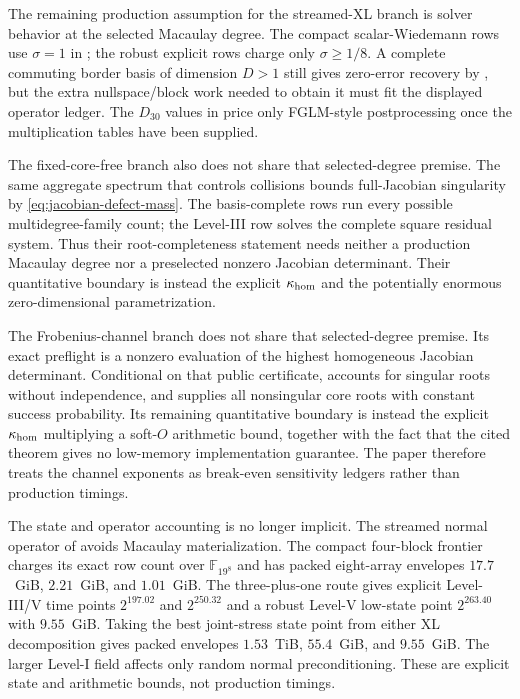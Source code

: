 \documentclass[11pt]{article}
\newcommand{\F}{\mathbb F}
\begin{document}
The remaining production assumption for the streamed-XL branch is solver
behavior at the selected Macaulay degree.  The compact scalar-Wiedemann rows use $\sigma=1$ in
; the robust explicit rows charge only
$\sigma\ge1/8$.  A complete commuting border basis of dimension $D>1$ still
gives zero-error recovery by , but the extra
nullspace/block work needed to obtain it must fit the displayed operator
ledger.  The $D_{30}$ values in  price only
FGLM-style postprocessing once the multiplication tables have been supplied.

The fixed-core-free branch also does not share that selected-degree premise.
The same aggregate spectrum that controls collisions bounds full-Jacobian
singularity by \eqref{eq:jacobian-defect-mass}.  The basis-complete rows run
every possible multidegree-family count; the Level-III row solves the complete
square residual system.  Thus their root-completeness statement needs neither
a production Macaulay degree nor a preselected nonzero Jacobian determinant.
Their quantitative boundary is instead the explicit $\kappa_{\rm hom}$ and
the potentially enormous zero-dimensional parametrization.

The Frobenius-channel branch does not share that selected-degree premise.  Its
exact preflight is a nonzero evaluation of the highest homogeneous Jacobian
determinant.  Conditional on that public certificate, 
accounts for singular roots without independence, and
 supplies all nonsingular core roots with
constant success probability.  Its remaining quantitative boundary is
instead the explicit $\kappa_{\rm hom}$ multiplying a soft-$O$ arithmetic
bound, together with the fact that the cited theorem gives no low-memory
implementation guarantee.  The paper therefore treats the channel exponents
as break-even sensitivity ledgers rather than production timings.

The state and operator accounting is no longer implicit.  The streamed normal
operator of  avoids Macaulay materialization.
The compact four-block frontier charges its exact row count over
$\F_{19^8}$ and has packed eight-array envelopes $17.7$~GiB,
$2.21$~GiB, and $1.01$~GiB.  The three-plus-one route gives explicit Level-III/V time points
$2^{197.02}$ and $2^{250.32}$ and a robust Level-V low-state point
$2^{263.40}$ with $9.55$~GiB.  Taking the best joint-stress state point from either XL decomposition gives
packed envelopes $1.53$~TiB, $55.4$~GiB, and $9.55$~GiB.  The larger Level-I field affects only random normal
preconditioning.  These are explicit state and arithmetic bounds, not
production timings.
\end{document}
